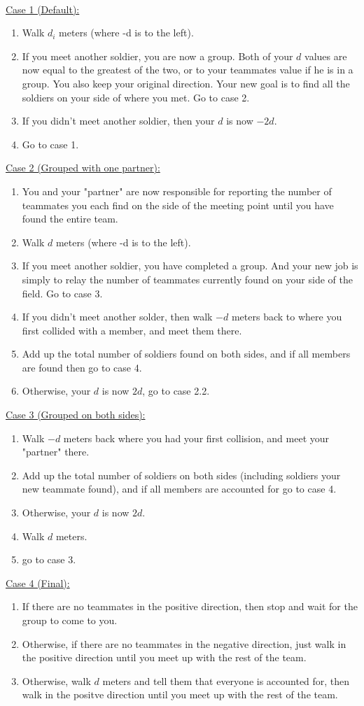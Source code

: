 \documentclass[a4paper,12pt]{article}
\begin{document}
 \\
\underline{Case 1 (Default):}
\begin{enumerate}
\item Walk \(d_i\) meters (where -d is to the left).
\item If you meet another soldier, you are now a group. Both of your \(d\) values are now equal to the
greatest of the two, or to your teammates value if he is in a group. You  also keep your original direction.
Your new goal is to find all the soldiers on your side of where you met. Go to case 2.
\item If you didn't meet another soldier, then your \(d\) is now \(-2d\).
\item Go to case 1.
\end{enumerate}
\underline{Case 2 (Grouped with one partner):}
\begin{enumerate}
\item You and your "partner" are now responsible for reporting the number of teammates you each find on the
side of the meeting point until you have found the entire team.
\item Walk \(d\) meters (where -d is to the left).
\item If you meet another soldier, you have completed a group. And your new job is simply to relay the number
of teammates currently found on your side of the field. Go to case 3.
\item If you didn't meet another solder, then walk \(-d\) meters back to where you first collided with
a member, and meet them there.
\item Add up the total number of soldiers found on both sides, and if all members are found then go to case 4.
\item Otherwise, your \(d\) is now \(2d\), go to case 2.2.
\end{enumerate}
\underline{Case 3 (Grouped on both sides):}
\begin{enumerate}
\item Walk \(-d\) meters back where you had your first collision, and meet your "partner" there.
\item Add up the total number of soldiers on both sides (including soldiers your new teammate found), and if
all members are accounted for go to case 4.
\item Otherwise, your \(d\) is now \(2d\).
\item Walk \(d\) meters.
\item go to case 3.
\end{enumerate}
\underline{Case 4 (Final):}
\begin{enumerate}
\item If there are no teammates in the positive direction, then stop and wait for the group to come to you.
\item Otherwise, if there are no teammates in the negative direction, just walk in the positive direction
until you meet up with the rest of the team.
\item Otherwise, walk \(d\) meters and tell them that everyone is accounted for, then walk in the positve
direction until you meet up with the rest of the team.
\end{enumerate}
\end{document}
